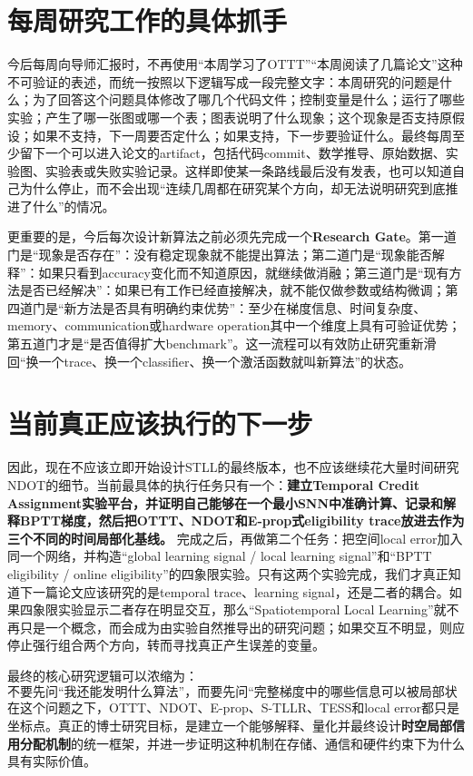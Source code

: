 \documentclass[journal,12pt,onecolumn]{IEEEtran}
\begin{document}
\section{每周研究工作的具体抓手}

今后每周向导师汇报时，不再使用“本周学习了OTTT”“本周阅读了几篇论文”这种不可验证的表述，而统一按照以下逻辑写成一段完整文字：本周研究的问题是什么；为了回答这个问题具体修改了哪几个代码文件；控制变量是什么；运行了哪些实验；产生了哪一张图或哪一个表；图表说明了什么现象；这个现象是否支持原假设；如果不支持，下一周要否定什么；如果支持，下一步要验证什么。最终每周至少留下一个可以进入论文的artifact，包括代码commit、数学推导、原始数据、实验图、实验表或失败实验记录。这样即使某一条路线最后没有发表，也可以知道自己为什么停止，而不会出现“连续几周都在研究某个方向，却无法说明研究到底推进了什么”的情况。

更重要的是，今后每次设计新算法之前必须先完成一个\textbf{Research Gate}。第一道门是“现象是否存在”：没有稳定现象就不能提出算法；第二道门是“现象能否解释”：如果只看到accuracy变化而不知道原因，就继续做消融；第三道门是“现有方法是否已经解决”：如果已有工作已经直接解决，就不能仅做参数或结构微调；第四道门是“新方法是否具有明确约束优势”：至少在梯度信息、时间复杂度、memory、communication或hardware operation其中一个维度上具有可验证优势；第五道门才是“是否值得扩大benchmark”。这一流程可以有效防止研究重新滑回“换一个trace、换一个classifier、换一个激活函数就叫新算法”的状态。

\section{当前真正应该执行的下一步}

因此，现在不应该立即开始设计STLL的最终版本，也不应该继续花大量时间研究NDOT的细节。当前最具体的执行任务只有一个：\textbf{建立Temporal Credit Assignment实验平台，并证明自己能够在一个最小SNN中准确计算、记录和解释BPTT梯度，然后把OTTT、NDOT和E-prop式eligibility trace放进去作为三个不同的时间局部化基线。} 完成之后，再做第二个任务：把空间local error加入同一个网络，并构造“global learning signal / local learning signal”和“BPTT eligibility / online eligibility”的四象限实验。只有这两个实验完成，我们才真正知道下一篇论文应该研究的是temporal trace、learning signal，还是二者的耦合。如果四象限实验显示二者存在明显交互，那么“Spatiotemporal Local Learning”就不再只是一个概念，而会成为由实验自然推导出的研究问题；如果交互不明显，则应停止强行组合两个方向，转而寻找真正产生误差的变量。

最终的核心研究逻辑可以浓缩为：
\begin{equation}
\boxed{
\text{不要先问“我还能发明什么算法”，而要先问“完整梯度中的哪些信息可以被局部状态可靠地保留？”}
}
\end{equation}
在这个问题之下，OTTT、NDOT、E-prop、S-TLLR、TESS和local error都只是坐标点。真正的博士研究目标，是建立一个能够解释、量化并最终设计\textbf{时空局部信用分配机制}的统一框架，并进一步证明这种机制在存储、通信和硬件约束下为什么具有实际价值。




\end{document}
